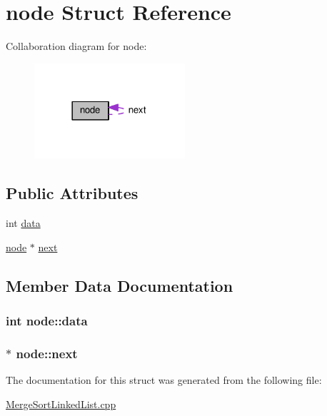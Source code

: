 \hypertarget{structnode}{}\section{node Struct Reference}
\label{structnode}


Collaboration diagram for node\+:
\nopagebreak
\begin{figure}[H]
\begin{center}
\leavevmode
\includegraphics[width=158pt]{structnode__coll__graph}
\end{center}
\end{figure}
\subsection*{Public Attributes}
\begin{DoxyCompactItemize}
\item 
int \hyperlink{structnode_a2d890bb9f6af0ffd73fe79b21124c2a2}{data}
\item 
\hyperlink{structnode}{node} $\ast$ \hyperlink{structnode_aad210fa7c160a49f6b9a3ffee592a2bc}{next}
\end{DoxyCompactItemize}


\subsection{Member Data Documentation}
\subsubsection[{\texorpdfstring{data}{data}}]{\setlength{\rightskip}{0pt plus 5cm}int node\+::data}\hypertarget{structnode_a2d890bb9f6af0ffd73fe79b21124c2a2}{}\label{structnode_a2d890bb9f6af0ffd73fe79b21124c2a2}
\subsubsection[{\texorpdfstring{next}{next}}]{$\ast$ node\+::next}\hypertarget{structnode_aad210fa7c160a49f6b9a3ffee592a2bc}{}\label{structnode_aad210fa7c160a49f6b9a3ffee592a2bc}


The documentation for this struct was generated from the following file\+:\begin{DoxyCompactItemize}
\item 
\hyperlink{MergeSortLinkedList_8cpp}{Merge\+Sort\+Linked\+List.\+cpp}\end{DoxyCompactItemize}
